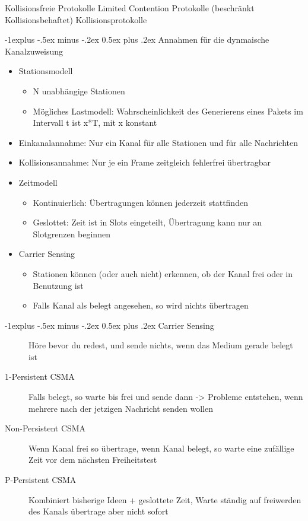 \documentclass[10pt,landscape]{article}
\makeatletter
\renewcommand{\subsection}{\@startsection{subsection}{2}{0mm}%
                                {-1explus -.5ex minus -.2ex}%
                                {0.5ex plus .2ex}%
                                {\normalfont\normalsize\bfseries}}
\makeatother
\begin{document}
\begin{multicols}{3}
Kollisionsfreie Protokolle
Limited Contention Protokolle (beschränkt Kollisionsbehaftet)
Kollisionsprotokolle 

\subsection{Annahmen für die dynmaische Kanalzuweisung}
\begin{itemize}
    \item Stationsmodell
    \begin{itemize}
        \item N unabhängige Stationen
        \item Mögliches Lastmodell: Wahrscheinlichkeit des Generierens eines Pakets im Intervall t ist x*T, mit x konstant
    \end{itemize}
    \item Einkanalannahme: Nur ein Kanal für alle Stationen und für alle Nachrichten
    \item Kollisionsannahme: Nur je ein Frame zeitgleich fehlerfrei übertragbar
    \item Zeitmodell
    \begin{itemize}
        \item Kontinuierlich: Übertragungen können jederzeit stattfinden
        \item Geslottet: Zeit ist in Slots eingeteilt, Übertragung kann nur an Slotgrenzen beginnen
    \end{itemize}
    \item Carrier Sensing
    \begin{itemize}
        \item Stationen können (oder auch nicht) erkennen, ob der Kanal frei oder in Benutzung ist
        \item Falls Kanal als belegt angesehen, so wird nichts übertragen
    \end{itemize}
\end{itemize}

\subsection{Carrier Sensing}
\begin{description}
    \item[] Höre bevor du redest, und sende nichts, wenn das Medium gerade belegt ist
    \item[1-Persistent CSMA] Falls belegt, so warte bis frei und sende dann -> Probleme entstehen, wenn mehrere nach der jetzigen Nachricht senden wollen
    \item[Non-Persistent CSMA] Wenn Kanal frei so übertrage, wenn Kanal belegt, so warte eine zufällige Zeit vor dem nächsten Freiheitstest
    \item[P-Persistent CSMA] Kombiniert bisherige Ideen + geslottete Zeit, Warte ständig auf freiwerden des Kanals übertrage aber nicht sofort
\end{description}


\end{multicols}
\end{document}

